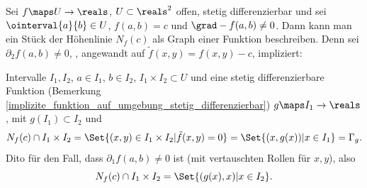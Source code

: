 \begin{folgerung}\label{satz_von_der_impliziten_funktion:hoehenlinie_folgerung}
  Sei \( f\maps U\to \reals \), \( U\subset \reals^2 \) offen, stetig differenzierbar und sei \( \ointerval{a}{b}\in U \), \( f(a,b)=c \) und \( \grad-{f(a,b)}\neq 0 \). Dann kann man ein Stück der Höhenlinie \( N_f(c) \) als Graph einer Funktion beschreiben. Denn sei \( \partial_2 f(a,b)\neq 0 \), ,  angewandt auf \( \tilde{f}(x,y)=f(x,y)-c \), impliziert:

  \texists Intervalle \( I_1,I_2 \), \( a\in I_1 \), \( b\in I_2 \), \( I_1\times I_2\subset U \) und eine stetig differenzierbare Funktion (Bemerkung \ref{implizite_funktion_auf_umgebung_stetig_differenzierbar}) \( g\maps I_1\to \reals \), mit \( g(I_1)\subset I_2 \) und
  \begin{multline*}
    N_f(c)\cap I_1\times I_2=\Set{(x,y)\in I_1\times I_2|\tilde{f}(x,y)=0}=\Set{(x,g(x))|x\in I_1}=\Gamma_g.
  \end{multline*}
  Dito für den Fall, dass \( \partial_1 f(a,b)\neq 0 \) ist (mit vertauschten Rollen für \( x, y \)), also
  \begin{equation*}
    N_f(c)\cap I_1\times I_2=\Set{(g(x),x)|x\in I_2}.
  \end{equation*}
\end{folgerung}
